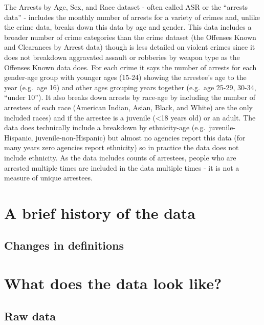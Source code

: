 \documentclass[
  12pt,
  openany]{book}
\begin{document}
The Arrests by Age, Sex, and Race dataset - often called ASR or the ``arrests data'' - includes the monthly number of arrests for a variety of crimes and, unlike the crime data, breaks down this data by age and gender. This data includes a broader number of crime categories than the crime dataset (the Offenses Known and Clearances by Arrest data) though is less detailed on violent crimes since it does not breakdown aggravated assault or robberies by weapon type as the Offenses Known data does. For each crime it says the number of arrests for each gender-age group with younger ages (15-24) showing the arrestee's age to the year (e.g.~age 16) and other ages grouping years together (e.g.~age 25-29, 30-34, ``under 10''). It also breaks down arrests by race-age by including the number of arrestees of each race (American Indian, Asian, Black, and White) are the only included races) and if the arrestee is a juvenile (\textless18 years old) or an adult. The data does technically include a breakdown by ethnicity-age (e.g.~juvenile-Hispanic, juvenile-non-Hispanic) but almost no agencies report this data (for many years zero agencies report ethnicity) so in practice the data does not include ethnicity. As the data includes counts of arrestees, people who are arrested multiple times are included in the data multiple times - it is not a measure of unique arrestees.

\hypertarget{a-brief-history-of-the-data-1}{%
\section{A brief history of the data}\label{a-brief-history-of-the-data-1}}

\hypertarget{changes-in-definitions-1}{%
\subsection{Changes in definitions}\label{changes-in-definitions-1}}

\hypertarget{what-does-the-data-look-like-1}{%
\section{What does the data look like?}\label{what-does-the-data-look-like-1}}

\hypertarget{raw-data}{%
\subsection{Raw data}\label{raw-data}}
\end{document}
